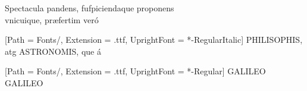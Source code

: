 \documentclass{article}
\begin{document}
\begin{center}
\vspace{2mm}
\fontsize{19}{19}\selectfont
Spectacula pandens, fufpiciendaque proponens\\
vnicuique, præfertim veró


\setmainfont{EBGaramond}[Path = Fonts/, 
                         Extension = .ttf,
                         UprightFont = *-RegularItalic]
\vspace{2mm}
{\fontsize{16}{16}\selectfont P\hspace{2mm}H\hspace{2mm}I\hspace{2mm}L\hspace{2mm}I\hspace{2mm}S\hspace{2mm}O\hspace{2mm}P\hspace{2mm}H\hspace{2mm}I\hspace{2mm}S\hspace{2mm},\hspace{2mm} atg\hspace{2mm} A\hspace{2mm}S\hspace{2mm}T\hspace{2mm}R\hspace{2mm}O\hspace{2mm}N\hspace{2mm}O\hspace{2mm}M\hspace{2mm}I\hspace{2mm}S\hspace{2mm}, que á}

\vspace{2mm}
\setmainfont{EBGaramond}[Path = Fonts/, 
                         Extension = .ttf,
                         UprightFont = *-Regular]
{\fontsize{31}{31}\selectfont
G\hspace{4mm}A\hspace{4mm}L\hspace{4mm}I\hspace{4mm}L\hspace{4mm}E\hspace{4mm}O\hspace{6mm} G\hspace{4mm}A\hspace{4mm}L\hspace{4mm}I\hspace{4mm}L\hspace{4mm}E\hspace{4mm}O}



\end{center}
\end{document}
